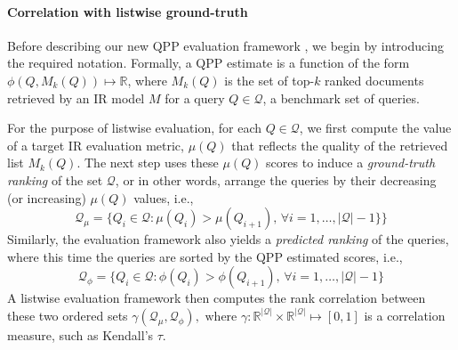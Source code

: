 \label{sec:propose}

\paragraph{Correlation with listwise ground-truth}
Before describing our new QPP evaluation framework \proposed, we begin by introducing the required notation. Formally, a QPP estimate is a function of the form $\phi(Q, M_k(Q)) \mapsto \mathbb{R}$, where $M_k(Q)$ is the set of top-$k$ ranked documents retrieved by an IR model $M$ for a query $Q \in \mathcal{Q}$, a benchmark set of queries.

For the purpose of listwise evaluation, for each $Q\in \mathcal{Q}$, we first compute the value of a target IR evaluation metric, $\mu(Q)$ that reflects the quality of the retrieved list $M_k(Q)$. The next step uses these $\mu(Q)$ scores to induce a \textit{ground-truth ranking} of the set $\mathcal{Q}$, or in other words, arrange the queries by their decreasing (or increasing) $\mu(Q)$ values, i.e., 
\begin{equation}
\mathcal{Q}_\mu = \{Q_i \in \mathcal{Q}: \mu(Q_i) > \mu(Q_{i+1}),
\, \forall i=1,\ldots,|\mathcal{Q}|-1\}  \}
\end{equation}
Similarly, the evaluation framework also yields a \emph{predicted ranking} of the queries, where this time the queries are sorted by the QPP estimated scores, i.e.,
\begin{equation}
\mathcal{Q}_\phi = \{Q_i \in \mathcal{Q}: \phi(Q_i) > \phi(Q_{i+1}),
\, \forall i=1,\ldots,|\mathcal{Q}|-1 \} 
\label{qpp_listwise_pred}
\end{equation}
A listwise evaluation framework then computes the rank correlation between these two ordered sets
$\gamma(\mathcal{Q}_\mu, \mathcal{Q}_\phi),\,\,\text{where}\,\, \gamma: \mathbb{R}^{|\mathcal{Q}|}\times\mathbb{R}^{|\mathcal{Q}|} \mapsto [0,1]$ is a correlation measure, such as Kendall's $\tau$.


